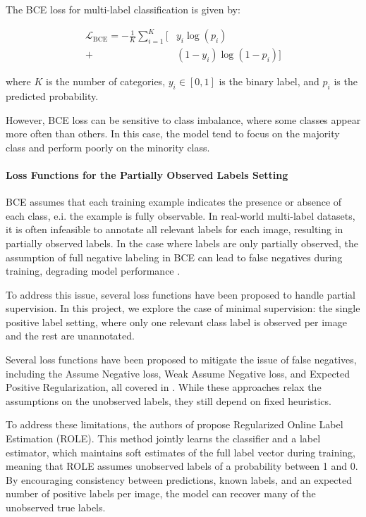 \documentclass[lettersize,journal]{IEEEtran}
\begin{document}
The BCE loss for multi-label classification is given by:

\begin{equation}
\begin{aligned}
\mathcal{L}_{\text{BCE}} = -\frac{1}{K} \sum_{i=1}^{K} \bigl[ &y_i\log(p_i) \\
+ &(1-y_i)\log(1 - p_i) \bigr]
\end{aligned}
\end{equation}

\noindent where $K$ is the number of categories, $y_i\in[0,1]$ is the binary label, and $p_i$ is the predicted probability.

However, BCE loss can be sensitive to class imbalance, where some classes appear more often than others. In this case, the model tend to focus on the majority class and perform poorly on the minority class. 

\paragraph{Loss Functions for the Partially Observed Labels Setting}
BCE assumes that each training example indicates the presence or absence of each class, e.i. the example is fully observable. In real-world multi-label datasets, it is often infeasible to annotate all relevant labels for each image, resulting in partially observed labels. In the case where labels are only partially observed, the assumption of full negative labeling in BCE can lead to false negatives during training, degrading model performance \cite{mlsp}. 

To address this issue, several loss functions have been proposed to handle partial supervision. In this project, we explore the case of minimal supervision: the single positive label setting, where only one relevant class label is observed per image and the rest are unannotated. 

Several loss functions have been proposed to mitigate the issue of false negatives, including the Assume Negative loss, Weak Assume Negative loss, and Expected Positive Regularization, all covered in \cite{mlsp}. While these approaches relax the assumptions on the unobserved labels, they still depend on fixed heuristics.

To address these limitations, the authors of \cite{mlsp} propose Regularized Online Label Estimation (ROLE). This method jointly learns the classifier and a label estimator, which maintains soft estimates of the full label vector during training, meaning that ROLE assumes unobserved labels of a probability between 1 and 0. By encouraging consistency between predictions, known labels, and an expected number of positive labels per image, the model can recover many of the unobserved true labels.
\end{document}
